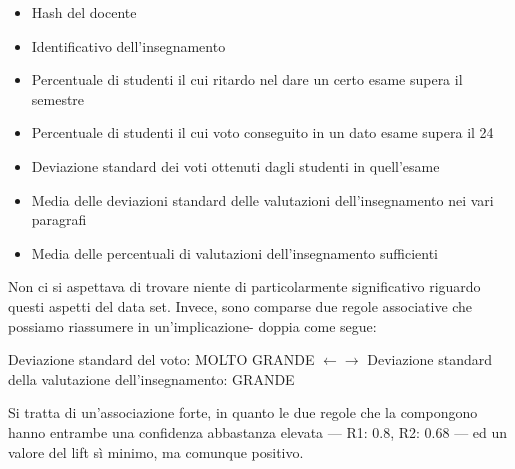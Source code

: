             \begin{itemize}
                \item Hash del docente
                \item Identificativo dell'insegnamento
                \item Percentuale di studenti il cui ritardo nel dare un certo esame supera il semestre
                \item Percentuale di studenti il cui voto conseguito in un dato esame supera il 24
                \item Deviazione standard dei voti ottenuti dagli studenti in quell'esame
                \item Media delle deviazioni standard delle valutazioni dell'insegnamento nei vari paragrafi
                \item Media delle percentuali di valutazioni dell'insegnamento sufficienti  
            \end{itemize}

            

            Non ci si aspettava di trovare niente di particolarmente significativo riguardo questi aspetti del data set. Invece, sono comparse due regole associative che possiamo riassumere in un'implicazione- doppia come segue:

            \begin{center}
                Deviazione standard del voto: MOLTO GRANDE $\leftarrow \rightarrow$ Deviazione standard della valutazione dell'insegnamento: GRANDE
            \end{center}

            Si tratta di un'associazione forte, in quanto le due regole che la compongono hanno entrambe una confidenza abbastanza elevata --- R1: 0.8, R2: 0.68 --- ed un valore del lift sì minimo, ma comunque positivo. \\
